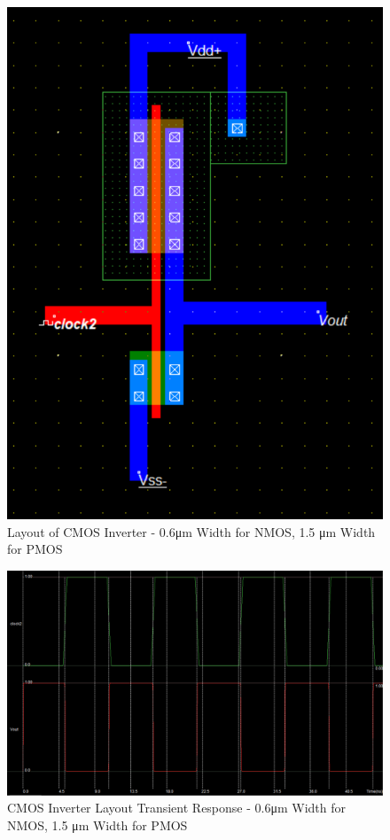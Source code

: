 \begin{figure}[h!]
	\centering
	\includegraphics[scale=0.75]{./images/inverter_06nmos15pmos.PNG}
	\caption{Layout of CMOS Inverter - 0.6\si{\micro\meter} Width for NMOS, 1.5 \si{\micro\meter} Width for PMOS}
	\label{fig:inverter_06nmos15pmos}
\end{figure}

\FloatBarrier

\FloatBarrier

\begin{figure}[h!]
	\centering
	\includegraphics[scale=0.50]{./images/inverter_transient_06nmos_15pmos.PNG}
	\caption{CMOS Inverter Layout Transient Response - 0.6\si{\micro\meter} Width for NMOS, 1.5 \si{\micro\meter} Width for PMOS}
	\label{fig:inverter_transient_06nmos_15pmos}
\end{figure}

